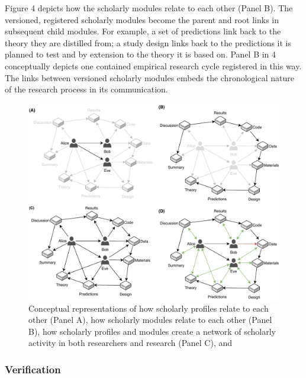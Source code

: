 \documentclass[a4paper]{article}
\begin{document}
Figure 4 depicts how the scholarly modules relate to each other (Panel
B). The versioned, registered scholarly modules become the parent and
root links in subsequent child modules. For example, a set of
predictions link back to the theory they are distilled from; a study
design links back to the predictions it is planned to test and by
extension to the theory it is based on. Panel B in 4 conceptually
depicts one contained empirical research cycle registered in this way.
The links between versioned scholarly modules embeds the chronological
nature of the research process in its communication.

\begin{figure}

{\centering \includegraphics[width=1\linewidth]{assets/fig4} 

}

\caption{Conceptual representations of how scholarly profiles relate to each other (Panel A), how scholarly modules relate to each other (Panel B), how scholarly profiles and modules create a network of scholarly activity in both researchers and research (Panel C), and }\label{fig:unnamed-chunk-6}
\end{figure}

\hypertarget{verification}{%
\subsubsection{Verification}\label{verification}}
\end{document}
